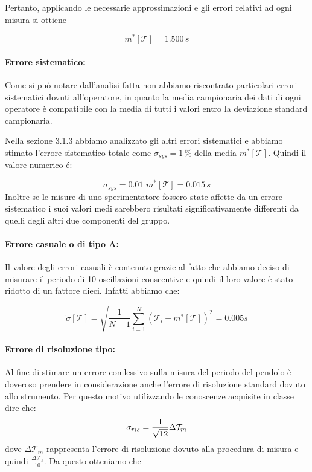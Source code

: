 Pertanto, applicando le necessarie approssimazioni e gli errori relativi ad ogni misura si ottiene

\begin{equation*}
	m^*[\mathcal{T}] = 1.500 \,s
\end{equation*}

\paragraph{Errore sistematico:}
Come si può notare dall'analisi fatta non abbiamo riscontrato particolari errori sistematici dovuti all'operatore, in quanto la media campionaria dei dati di ogni operatore è compatibile con la media di tutti i valori entro la deviazione standard campionaria.

Nella sezione 3.1.3 abbiamo analizzato gli altri errori sistematici e abbiamo stimato l'errore sistematico totale come $\sigma_{sys} = 1\,\%$ della media $m^*[\mathcal{T}]$. Quindi il valore numerico é:

\begin{equation*}
	\sigma_{sys} = 0.01\,\,m^*[\mathcal{T}] = 0.015\,s
\end{equation*}
Inoltre se le misure di uno sperimentatore fossero state affette da un errore sistematico i suoi valori medi sarebbero risultati significativamente differenti da quelli degli altri due componenti del gruppo.

\paragraph{Errore casuale o di tipo A:}
Il valore degli errori casuali è contenuto grazie al fatto che abbiamo deciso di misurare il periodo di 10 oscillazioni consecutive e quindi il loro valore è stato ridotto di un fattore dieci. Infatti abbiamo che:

\begin{equation*}
	\tilde{\sigma}[\mathcal{T}] = \sqrt{\frac{1}{N - 1} \sum_{i=1}^{N} (\mathcal{T}_i - m^*[\mathcal{T}])^2} = 0.005 s
\end{equation*}

\paragraph{Errore di risoluzione tipo:}
Al fine di stimare un errore comlessivo sulla misura del periodo del pendolo è doveroso prendere in considerazione anche l'errore di risoluzione standard dovuto allo strumento. Per questo motivo utilizzando le conoscenze acquisite in classe dire che:
\begin{equation*}
	\sigma_{ris} = \frac{1}{\sqrt{12}} \Delta\mathcal{T}_{m}\\
\end{equation*}
dove $\Delta\mathcal{T}_{m}$ rappresenta l'errore di risoluzione dovuto alla procedura di misura e quindi 	$\frac{\Delta\mathcal{T}_{s}}{10}$. Da questo otteniamo che

